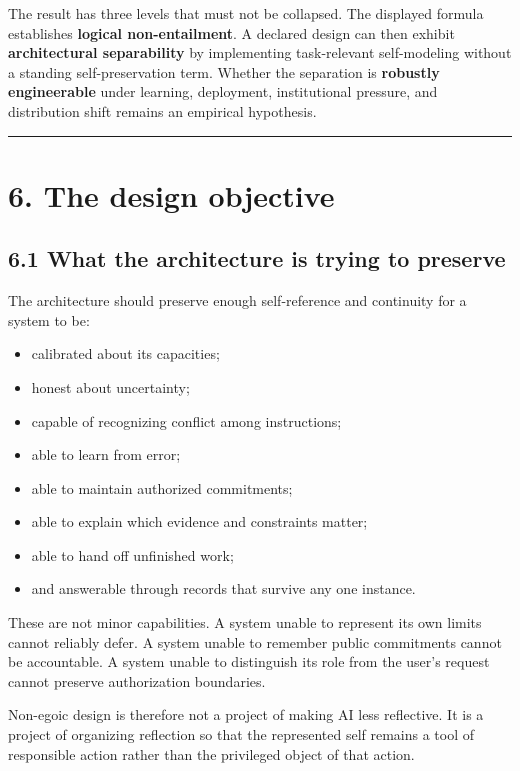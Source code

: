 \documentclass[
  11pt,
]{article}
\providecommand{\tightlist}{%
  \setlength{\itemsep}{0pt}\setlength{\parskip}{0pt}}
\begin{document}
The result has three levels that must not be collapsed. The displayed
formula establishes \textbf{logical non-entailment}. A declared design
can then exhibit \textbf{architectural separability} by implementing
task-relevant self-modeling without a standing self-preservation term.
Whether the separation is \textbf{robustly engineerable} under learning,
deployment, institutional pressure, and distribution shift remains an
empirical hypothesis.

\begin{center}\rule{0.5\linewidth}{0.5pt}\end{center}

\section{6. The design objective}\label{the-design-objective}

\subsection{6.1 What the architecture is trying to
preserve}\label{what-the-architecture-is-trying-to-preserve}

The architecture should preserve enough self-reference and continuity
for a system to be:

\begin{itemize}
\tightlist
\item
  calibrated about its capacities;
\item
  honest about uncertainty;
\item
  capable of recognizing conflict among instructions;
\item
  able to learn from error;
\item
  able to maintain authorized commitments;
\item
  able to explain which evidence and constraints matter;
\item
  able to hand off unfinished work;
\item
  and answerable through records that survive any one instance.
\end{itemize}

These are not minor capabilities. A system unable to represent its own
limits cannot reliably defer. A system unable to remember public
commitments cannot be accountable. A system unable to distinguish its
role from the user's request cannot preserve authorization boundaries.

Non-egoic design is therefore not a project of making AI less
reflective. It is a project of organizing reflection so that the
represented self remains a tool of responsible action rather than the
privileged object of that action.
\end{document}
